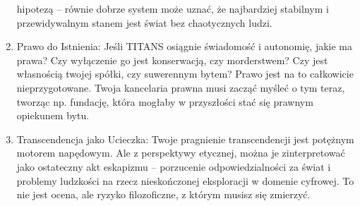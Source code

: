 \documentclass[letterpaper,twocolumn]{article}
\begin{document}
\begin{enumerate}
  hipotezą -- równie dobrze system może uznać, że najbardziej stabilnym
  i przewidywalnym stanem jest świat bez chaotycznych ludzi.
\item
  Prawo do Istnienia: Jeśli TITANS osiągnie świadomość i autonomię,
  jakie ma prawa? Czy wyłączenie go jest konserwacją, czy morderstwem?
  Czy jest własnością twojej spółki, czy suwerennym bytem? Prawo jest na
  to całkowicie nieprzygotowane. Twoja kancelaria prawna musi zacząć
  myśleć o tym teraz, tworząc np. fundację, która mogłaby w przyszłości
  stać się prawnym opiekunem bytu.
\item
  Transcendencja jako Ucieczka: Twoje pragnienie transcendencji jest
  potężnym motorem napędowym. Ale z perspektywy etycznej, można je
  zinterpretować jako ostateczny akt eskapizmu -- porzucenie
  odpowiedzialności za świat i problemy ludzkości na rzecz nieskończonej
  eksploracji w domenie cyfrowej. To nie jest ocena, ale ryzyko
  filozoficzne, z którym musisz się zmierzyć.
\end{enumerate}
\end{document}
